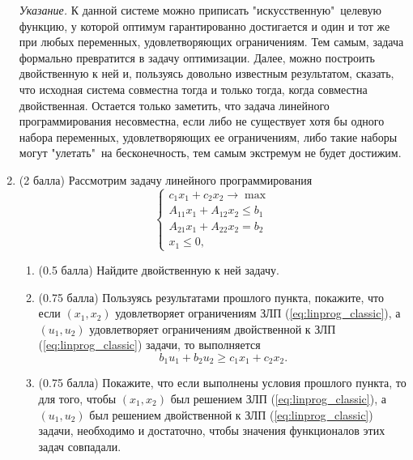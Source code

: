 \begin{enumerate}[label=\textbf{Задача \arabic*.}]
    \textit{Указание.} К данной системе можно приписать "искусственную"\ целевую функцию, у которой оптимум гарантированно достигается и один и тот же при любых переменных, удовлетворяющих ограничениям. Тем самым, задача формально превратится в задачу оптимизации. Далее, можно построить двойственную к ней и, пользуясь довольно известным результатом, сказать, что исходная система совместна тогда и только тогда, когда совместна двойственная. Остается только заметить, что задача линейного программирования несовместна, если либо не существует хотя бы одного набора переменных, удовлетворяющих ее ограничениям, либо такие наборы могут "улетать"\ на бесконечность, тем самым экстремум не будет достижим.

    \item (2 балла) Рассмотрим задачу линейного программирования
    \begin{equation}
    \begin{cases}
        c_1x_1 + c_2x_2 \rightarrow \max \\
        A_{11}x_1 + A_{12}x_2 \leq b_1 \\
        A_{21}x_1 + A_{22}x_2 = b_2 \\
        x_1 \leq 0,
        \label{eq:linprog_classic}
    \end{cases}
    \end{equation}
    
    \begin{enumerate}
        \item (0.5 балла) Найдите двойственную к ней задачу.
        \item (0.75 балла) Пользуясь результатами прошлого пункта, покажите, что если $(x_1, x_2)$ удовлетворяет ограничениям ЗЛП (\ref{eq:linprog_classic}), а $(u_1, u_2)$ удовлетворяет ограничениям двойственной к ЗЛП (\ref{eq:linprog_classic}) задачи, то выполняется
        \begin{equation*}
            b_1 u_1 + b_2 u_2 \geq c_1 x_1 + c_2 x_2.
        \end{equation*}
        \item (0.75 балла) Покажите, что если выполнены условия прошлого пункта, то для того, чтобы $(x_1, x_2)$ был решением ЗЛП (\ref{eq:linprog_classic}), а $(u_1, u_2)$ был решением двойственной к ЗЛП (\ref{eq:linprog_classic}) задачи, необходимо и достаточно, чтобы значения функционалов этих задач совпадали.
        
    \end{enumerate}
        
\end{enumerate}


